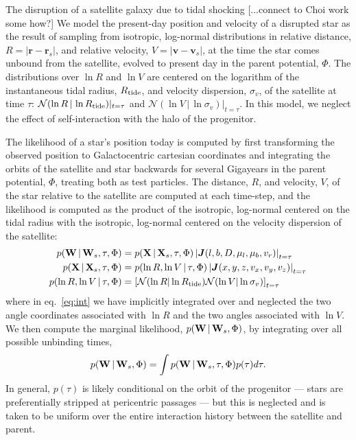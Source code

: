 \documentclass[letterpaper,12pt,preprint]{aastex}
\newcommand{\given}{\,|\,}
\newcommand{\jac}[1]{\left\vert \J{#1} \right\vert}
\newcommand{\D}{{\bf D}}
\newcommand{\W}{{\bf W}}
\newcommand{\X}{{\bf X}}
\newcommand{\J}{{\boldsymbol J}}
\newcommand{\rtide}{R_{\rm tide}}
\newcommand{\bsr}{\boldsymbol r}
\newcommand{\bsv}{\boldsymbol v}
\begin{document}
The disruption of a satellite galaxy due to tidal shocking [...connect to Choi work some how?] We model the present-day position and velocity of a disrupted star as the result of sampling from isotropic, log-normal distributions in relative distance, $R=\left\vert \bsr-\bsr_s \right\vert$, and relative velocity, $V=\left\vert \bsv-\bsv_s \right\vert$, at the time the star comes unbound from the satellite, evolved to present day in the parent potential, $\Phi$. The distributions over $\ln R$ and $\ln V$ are centered on the logarithm of the instantaneous tidal radius, $R_{\rm tide}$, and velocity dispersion, $\sigma_v$, of the satellite at time $\tau$: $\mathcal{N}(\ln R \given \ln\rtide)\vert_{t=\tau}$ and $\mathcal{N}(\ln V \given \ln \sigma_v)\vert_{t=\tau}$. In this model, we neglect the effect of self-interaction with the halo of the progenitor. 

The likelihood of a star's position today is computed by first transforming the observed position to Galactocentric cartesian coordinates and integrating the orbits of the satellite and star backwards for several Gigayears in the parent potential, $\Phi$, treating both as test particles. The distance, $R$, and velocity, $V$, of the star relative to the satellite are computed at each time-step, and the likelihood is computed as the product of the isotropic, log-normal centered on the tidal radius with the isotropic, log-normal centered on the velocity dispersion of the satellite:
\begin{align}
	p(\W \given \W_s, \tau, \Phi) &= p(\X \given \X_s, \tau, \Phi) \jac{(l,b,D,\mu_l,\mu_b,v_r)}_{t=\tau}\\
	p(\X \given \X_s, \tau, \Phi) &= p(\ln R, \ln V \given \tau, \Phi) \jac{(x,y,z,v_x,v_y,v_z)}_{t=\tau}\label{eq:int} \\
	p(\ln R, \ln V \given \tau, \Phi) &= \left[\mathcal{N}(\ln R | \ln \rtide)\mathcal{N}(\ln V | \ln \sigma_v)\right]_{t=\tau}
\end{align}
where in eq.~\ref{eq:int} we have implicitly integrated over and neglected the two angle coordinates associated with $\ln R$ and the two angles associated with $\ln V$. We then compute the marginal likelihood, $p(\W \given \W_s, \Phi)$, by integrating over all possible unbinding times,
\begin{align}
	p(\W \given \W_s, \Phi) = \int p(\W \given \W_s, \tau, \Phi)p(\tau) d\tau.
\end{align}
In general, $p(\tau)$ is likely conditional on the orbit of the progenitor --- stars are preferentially stripped at pericentric passages --- but this is neglected and is taken to be uniform over the entire interaction history between the satellite and parent. 
\end{document}

